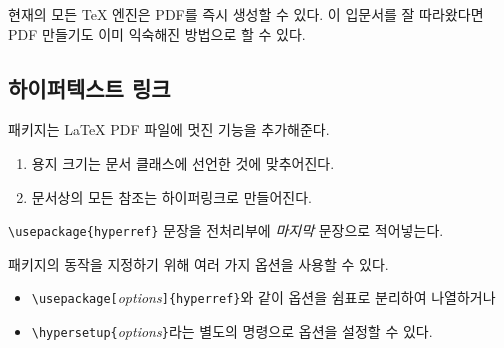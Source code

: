현재의 모든 \TeX{} 엔진은 PDF를 즉시 생성할 수 있다. 이 입문서를 잘 따라왔다면 
PDF 만들기도 이미 익숙해진 방법으로 할 수 있다.

\subsection{하이퍼텍스트 링크}
\label{ssec:pdfhyperref}

 패키지는 \LaTeX{} PDF 파일에 멋진 기능을 추가해준다.

\begin{enumerate} \firmlist
\item 용지 크기는 문서 클래스에 선언한 것에 맞추어진다.
\item 문서상의 모든 참조는 하이퍼링크로 만들어진다.
\end{enumerate}

\verb+\usepackage{hyperref}+ 문장을 전처리부에 \emph{마지막} 문장으로 적어넣는다.

 패키지의 동작을 지정하기 위해 여러 가지 옵션을 사용할 수 있다.
\begin{itemize} \firmlist
\item \verb|\usepackage[|\emph{options}\verb|]{hyperref}|와 같이 옵션을 쉼표로 분리하여 나열하거나
\item \verb|\hypersetup{|\emph{options}\verb|}|라는 별도의 명령으로 옵션을 설정할 수 있다.
\end{itemize}

